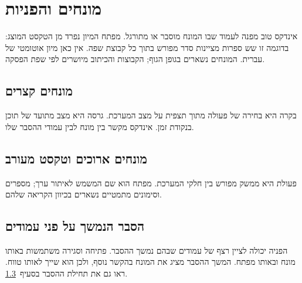 \def\lakitlanguageprofile{hebrew-with-english}
\def\lakitindexcolumns{1} %




\tableofcontents
\chapter{מונחים והפניות}
\noindent אינדקס טוב מפנה לעמוד שבו המונח מוסבר או מתורגל. מפתח המיון נפרד מן הטקסט המוצג:
בדוגמה זו שש ספרות מציינות סדר מפורש בתוך כל קבוצת שפה. אין כאן מיון אוטומטי של עברית.
המונחים נשארים בגופן הגוף; הקבוצות והכיתוב מיושרים לפי שפת הפסקה.

\section{מונחים קצרים}
\noindent בקרה היא בחירה של פעולה מתוך תצפית על מצב המערכת.
גרסה היא מצב מתועד של תוכן בנקודת זמן.
אינדקס מקשר בין מונח לבין עמודי ההסבר שלו.

\section{מונחים ארוכים וטקסט מעורב}
\noindent פעולת  היא ממשק מפורש בין חלקי המערכת.
מפתח הוא שם המשמש לאיתור ערך; מספרים וסימונים מתמטיים נשארים בכיוון הקריאה שלהם.

\clearpage
\section{הסבר הנמשך על פני עמודים}
\label{sec:index-range-start}
\noindent הפניה יכולה לציין רצף של עמודים שבהם נמשך ההסבר. פתיחה וסגירה משתמשות באותו מונח ובאותו מפתח.
\clearpage
\noindent המשך ההסבר מציג את המונח בהקשר נוסף, ולכן הוא שייך לאותו טווח.
ראו גם את תחילת ההסבר בסעיף~\ref{sec:index-range-start}.
\clearpage
\printindex

